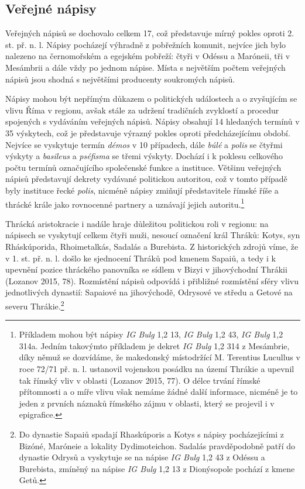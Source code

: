
\subsection[veřejné-nápisy-9]{Veřejné nápisy}

Veřejných nápisů se dochovalo celkem 17, což představuje mírný pokles oproti 2. st. př. n. l. Nápisy pocházejí výhradně z pobřežních komunit, nejvíce jich bylo nalezeno na černomořském a egejském pobřeží: čtyři v Odéssu a Maróneii, tři v Mesámbrii a dále vždy po jednom nápise. Místa s největším počtem veřejných nápisů jsou shodná s největšími producenty soukromých nápisů.

Nápisy mohou být nepřímým důkazem o politických událostech a o zvyšujícím se vlivu Říma v regionu, avšak stále za udržení tradičních zvyklostí a procedur spojených s vydáváním veřejných nápisů. Nápisy obsahují 14 hledaných termínů v 35 výskytech, což je představuje výrazný pokles oproti předcházejícímu období. Nejvíce se vyskytuje termín {\em démos} v 10 případech, dále {\em búlé} a {\em polis} se čtyřmi výskyty a {\em basileus} a {\em pséfisma} se třemi výskyty. Dochází i k poklesu celkového počtu termínů označujícího společenské funkce a instituce. Většinu veřejných nápisů představují dekrety vydávané politickou autoritou, což v tomto případě byly instituce řecké {\em polis}, nicméně nápisy zmiňují představitele římské říše a thrácké krále jako rovnocenné partnery a uznávají jejich autoritu.\footnote{Příkladem mohou být nápisy {\em IG Bulg} 1,2 13, {\em IG Bulg} 1,2 43, {\em IG Bulg} 1,2 314a. Jedním takovýmto příkladem je dekret {\em IG Bulg} 1,2 314 z Mesámbrie, díky němuž se dozvídáme, že makedonský místodržící M. Terentius Lucullus v roce 72/71 př. n. l. ustanovil vojenskou posádku na území Thrákie a upevnil tak římský vliv v oblasti (Lozanov 2015, 77). O délce trvání římské přítomnosti a o míře vlivu však nemáme žádné další informace, nicméně je to jeden z prvních náznaků římského zájmu v oblasti, který se projevil i v epigrafice.}

Thrácká aristokracie i nadále hraje důležitou politickou roli v regionu: na nápisech se vyskytují celkem čtyři muži, nesoucí označení král Thráků: Kotys, syn Rháskúporida, Rhoimetalkás, Sadalás a Burebista. Z historických zdrojů víme, že v 1. st. př. n. l. došlo ke sjednocení Thráků pod kmenem Sapaiů, a tedy i k upevnění pozice thráckého panovníka se sídlem v Bizyi v jihovýchodní Thrákii (Lozanov 2015, 78). Rozmístění nápisů odpovídá i přibližné rozmístění sféry vlivu jednotlivých dynastií: Sapaiové na jihovýchodě, Odrysové ve středu a Getové na severu Thrákie.\footnote{Do dynastie Sapaiů spadají Rhaskúporis a Kotys s nápisy pocházejícími z Bizóné, Maróneie a lokality Dydimoteichon. Sadalás pravděpodobně patří do dynastie Odrysů a vyskytuje se na nápise {\em IG Bulg} 1,2 43 z Odéssu a Burebista, zmíněný na nápise {\em IG Bulg} 1,2 13 z Dionýsopole pochází z kmene Getů.}

